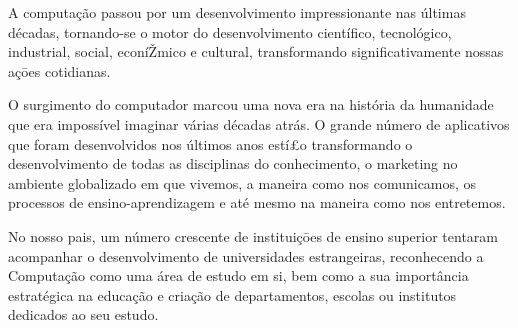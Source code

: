 A computação passou por um desenvolvimento impressionante nas últimas décadas, 
tornando-se o motor do desenvolvimento cientí­fico, tecnológico, 
industrial, social, econíŽmico e cultural, transformando significativamente 
nossas açōes cotidianas.

O surgimento do computador marcou uma nova era na história da humanidade 
que era impossí­vel imaginar várias décadas atrás. O grande número de aplicativos 
que foram desenvolvidos nos últimos anos estí£o transformando o desenvolvimento 
de todas as disciplinas do conhecimento, o marketing no ambiente globalizado 
em que vivemos, a maneira como nos comunicamos, os processos de 
ensino-aprendizagem e até mesmo na maneira como nos entretemos.


No nosso pais, um número crescente de instituiçōes de ensino superior
tentaram acompanhar o desenvolvimento de universidades estrangeiras, reconhecendo a Computação como uma área de estudo
em si, bem como a sua importância estratégica na educação e criação de
departamentos, escolas ou institutos dedicados ao seu estudo. 